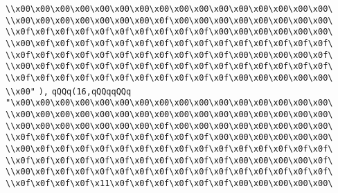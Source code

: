 \verb|\\x00\x00\x00\x00\x00\x00\x00\x00\x00\x00\x00\x00\x00\x00\x00\x00\|\newline
\verb|\\x00\x00\x00\x00\x00\x00\x00\x0f\x00\x00\x00\x00\x00\x00\x00\x00\|\newline
\verb|\\x0f\x0f\x0f\x0f\x0f\x0f\x0f\x0f\x0f\x0f\x00\x00\x00\x00\x00\x00\|\newline
\verb|\\x00\x0f\x0f\x0f\x0f\x0f\x0f\x0f\x0f\x0f\x0f\x0f\x0f\x0f\x0f\x0f\|\newline
\verb|\\x0f\x0f\x0f\x0f\x0f\x0f\x0f\x0f\x0f\x0f\x0f\x00\x00\x00\x00\x0f\|\newline
\verb|\\x00\x0f\x0f\x0f\x0f\x0f\x0f\x0f\x0f\x0f\x0f\x0f\x0f\x0f\x0f\x0f\|\newline
\verb|\\x0f\x0f\x0f\x0f\x0f\x0f\x0f\x0f\x0f\x0f\x0f\x00\x00\x00\x00\x00\|\newline
\verb|\\x00"|\newline
\verb|),|\newline
\verb|qQQq(16,qQQqqQQq|\newline
\verb|"\x00\x00\x00\x00\x00\x00\x00\x00\x00\x00\x00\x00\x00\x00\x00\x00\|\newline
\verb|\\x00\x00\x00\x00\x00\x00\x00\x00\x00\x00\x00\x00\x00\x00\x00\x00\|\newline
\verb|\\x00\x00\x00\x00\x00\x00\x00\x0f\x00\x00\x00\x00\x00\x00\x00\x00\|\newline
\verb|\\x0f\x0f\x0f\x0f\x0f\x0f\x0f\x0f\x0f\x0f\x00\x00\x00\x00\x00\x00\|\newline
\verb|\\x00\x0f\x0f\x0f\x0f\x0f\x0f\x0f\x0f\x0f\x0f\x0f\x0f\x0f\x0f\x0f\|\newline
\verb|\\x0f\x0f\x0f\x0f\x0f\x0f\x0f\x0f\x0f\x0f\x0f\x00\x00\x00\x00\x0f\|\newline
\verb|\\x00\x0f\x0f\x0f\x0f\x0f\x0f\x0f\x0f\x0f\x0f\x0f\x0f\x0f\x0f\x0f\|\newline
\verb|\\x0f\x0f\x0f\x0f\x11\x0f\x0f\x0f\x0f\x0f\x0f\x00\x00\x00\x00\x00\|\newline
